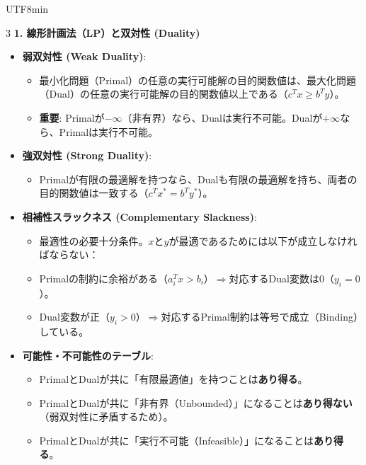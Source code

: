 \documentclass[8pt,a4paper]{article}
\begin{document}
\begin{CJK}{UTF8}{min}
\begin{multicols}{3}
\textbf{1. 線形計画法（LP）と双対性 (Duality)}
\begin{itemize}
    \item \textbf{弱双対性 (Weak Duality)}:
    \begin{itemize}
        \item 最小化問題（Primal）の任意の実行可能解の目的関数値は、最大化問題（Dual）の任意の実行可能解の目的関数値以上である（$c^T x \geq b^T y$）。
        \item \textbf{重要}: Primalが$-\infty$（非有界）なら、Dualは実行不可能。Dualが$+\infty$なら、Primalは実行不可能。
    \end{itemize}
    \item \textbf{強双対性 (Strong Duality)}:
    \begin{itemize}
        \item Primalが有限の最適解を持つなら、Dualも有限の最適解を持ち、両者の目的関数値は一致する（$c^T x^* = b^T y^*$）。
    \end{itemize}
    \item \textbf{相補性スラックネス (Complementary Slackness)}:
    \begin{itemize}
        \item 最適性の必要十分条件。$x$と$y$が最適であるためには以下が成立しなければならない：
        \item Primalの制約に余裕がある（$a_i^T x > b_i$）$\Rightarrow$対応するDual変数は0（$y_i = 0$）。
        \item Dual変数が正（$y_i > 0$）$\Rightarrow$対応するPrimal制約は等号で成立（Binding）している。
    \end{itemize}
    \item \textbf{可能性・不可能性のテーブル}:
    \begin{itemize}
        \item PrimalとDualが共に「有限最適値」を持つことは\textbf{あり得る}。
        \item PrimalとDualが共に「非有界（Unbounded）」になることは\textbf{あり得ない}（弱双対性に矛盾するため）。
        \item PrimalとDualが共に「実行不可能（Infeasible）」になることは\textbf{あり得る}。
    \end{itemize}
\end{itemize}


\end{multicols}
\end{CJK}
\end{document}
